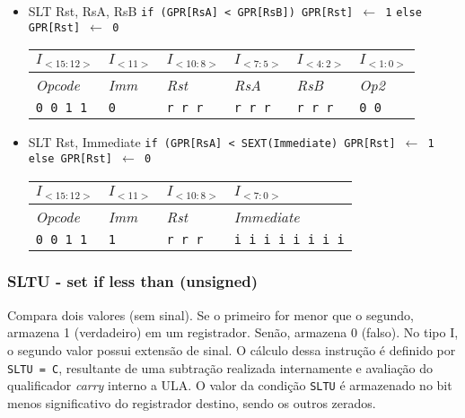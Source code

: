 \documentclass{extreport}
\begin{document}
\begin{itemize}
\item SLT Rst, RsA, RsB
\subitem \texttt{if (GPR[RsA] < GPR[RsB]) GPR[Rst] $\leftarrow$ 1}
\subitem \texttt{else GPR[Rst] $\leftarrow$ 0}
\begin{table}[ht!]
\centering
\begin{tabular}{|p{1.6cm}|p{1.6cm}|p{1.6cm}|p{1.6cm}|p{1.6cm}|p{1.6cm}|}
\hline
$I_{<15:12>}$ & $I_{<11>}$ & $I_{<10:8>}$ & $I_{<7:5>}$ & $I_{<4:2>}$ & $I_{<1:0>}$ \\ \hline
\textit{Opcode} & \textit{Imm} & \textit{Rst} & \textit{RsA} & \textit{RsB} & \textit{Op2} \\ \hline
\texttt{0 0 1 1} & \texttt{0} & \texttt{r r r} & \texttt{r r r} & \texttt{r r r} & \texttt{0 0} \\ \hline
\end{tabular}
\end{table}

\item SLT Rst, Immediate
\subitem \texttt{if (GPR[RsA] < SEXT(Immediate) GPR[Rst] $\leftarrow$ 1}
\subitem \texttt{else GPR[Rst] $\leftarrow$ 0}
\begin{table}[ht!]
\centering
\begin{tabular}{|p{1.6cm}|p{1.6cm}|p{1.6cm}|p{5.65cm}|}
\hline
$I_{<15:12>}$ & $I_{<11>}$ & $I_{<10:8>}$ & $I_{<7:0>}$ \\ \hline
\textit{Opcode} & \textit{Imm} & \textit{Rst} & \textit{Immediate} \\ \hline
\texttt{0 0 1 1} & \texttt{1} & \texttt{r r r} & \texttt{i i i i i i i i} \\ \hline
\end{tabular}
\end{table}
\end{itemize}

\subsubsection{SLTU - set if less than (unsigned)}
Compara dois valores (sem sinal). Se o primeiro for menor que o segundo, armazena 1 (verdadeiro) em um registrador. Senão, armazena 0 (falso). No tipo I, o segundo valor possui extensão de sinal. O cálculo dessa instrução é definido por \texttt{SLTU = C}, resultante de uma subtra\c{c}\~{a}o realizada internamente e avaliação do qualificador \textit{carry} interno a ULA. O valor da condição \texttt{SLTU} é armazenado no bit menos significativo do registrador destino, sendo os outros zerados.
\end{document}
